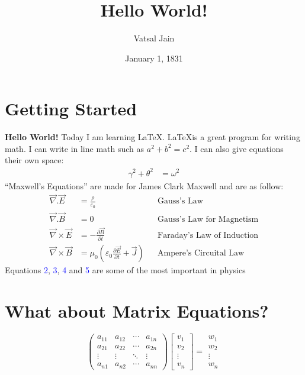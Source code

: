 \documentclass[12pt]{article} %
\title{Hello World!} %
\author{Vatsal Jain} %
\date{January 1, 1831}
\begin{document}
\maketitle %
\section{Getting Started}
\textbf{Hello World!} Today I am learning \LaTeX. \LaTeX is a great program for writing math. I can write in line math such as $a^2+b^2 = c^2$. I can also give equations their own space:\thispagestyle{empty} %
\begin{align}
\gamma^2 + \theta^2 &= \omega^2 %
\end{align} %
``Maxwell's Equations'' are made for James Clark Maxwell and are as follow:
\begin{align}
\vec{\nabla}.\vec{E} &= \frac{\rho}{\varepsilon_0} & & \text{Gauss's Law} \\ %
\vec{\nabla}.\vec{B} &= 0 & & \text{Gauss's Law for Magnetism}\\
\vec{\nabla} \times \vec{E} &= -\frac{\partial \vec{B}}{\partial t} & & \text{Faraday's Law of Induction} \\
\vec{\nabla} \times \vec{B} &= \mu_0\left(\varepsilon_0\frac{\partial \vec{E}}{\partial t}+\vec{J} \right) & & \text{Ampere's Circuital Law} 
\end{align}
Equations \textcolor{blue}{2}, \textcolor{blue}{3}, \textcolor{blue}{4} and \textcolor{blue}{5} are some of the most important in physics
\section{What about Matrix Equations?}
$$\begin{pmatrix} %
a_{11} & a_{12} & \cdots & a_{1n} \\
a_{21} & a_{22} & \cdots & a_{2n} \\
\vdots  & \vdots  & \ddots & \vdots  \\
a_{n1} & a_{n2} & \cdots & a_{nn} 
\end{pmatrix}\begin{bmatrix} %
v_1 \\
v_2 \\
\vdots \\
v_n
\end{bmatrix}=\begin{matrix}
w_1 \\
w_2 \\
\vdots \\
w_n
\end{matrix} $$
\pagebreak %
\end{document}
